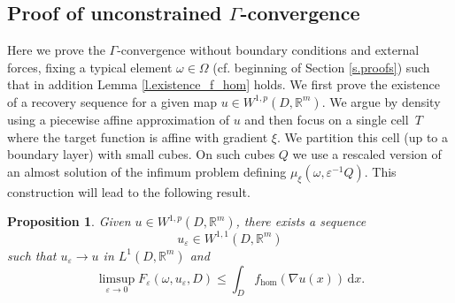 \documentclass[11pt]{article}
\newcommand{\cf}{cf.\xspace}
\numberwithin{equation}{section}
\newtheorem{proposition}[theorem]{Proposition}
\theoremstyle{definition}
\let\e\varepsilon
\let\w\omega
\newcommand{\R}{\mathbb{R}}
\begin{document}
\subsection{Proof of unconstrained \texorpdfstring{$\Gamma$}{}-convergence}
Here we prove the $\Gamma$-convergence without boundary conditions and external forces, fixing a typical element $\w\in\Omega$ (\cf beginning of Section \ref{s.proofs}) such that in addition Lemma \ref{l.existence_f_hom} holds. We first prove the existence of a recovery sequence for a given map $u\in W^{1,p}(D,\R^m)$. We argue by density using a piecewise affine approximation of $u$ and then focus on a single cell~$T$ where the target function is affine with gradient $\xi$. We partition this cell (up to a boundary layer) with small cubes. On such cubes $Q$ we use a rescaled version of an almost solution of the infimum problem defining $\mu_{\xi}(\w,\e^{-1}Q)$. This construction will lead to the following result.
\begin{proposition}\label{p.ub}
Given $u\in W^{1,p}(D,\R^m)$, there exists a sequence
\[
u_{\e}\in W^{1,1}(D,\R^m)
\]
such that $u_{\e}\to u$ in $L^1(D,\R^m)$ and
\begin{equation*}
\limsup_{\e\to 0}F_{\e}(\w,u_{\e},D)\leq \int_D f_{\hom}(\nabla u(x))\,\mathrm{d}x.
\end{equation*}
\end{proposition}
\end{document}

